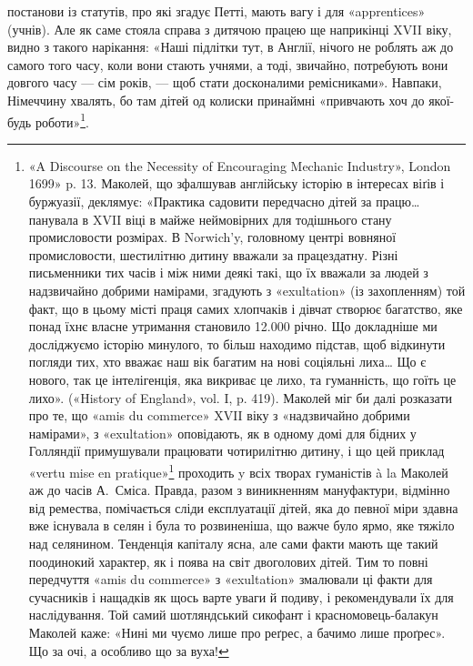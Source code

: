\parcont{}  %
постанови із статутів, про які згадує Петті, мають вагу і для
«apprentices» (учнів). Але як саме стояла справа з дитячою працею
ще наприкінці XVII віку, видно з такого нарікання: «Наші
підлітки тут, в Англії, нічого не роблять аж до самого того часу,
коли вони стають учнями, а тоді, звичайно, потребують вони довгого
часу — сім років, — щоб стати досконалими ремісниками».
Навпаки, Німеччину хвалять, бо там дітей од колиски принаймні
«привчають хоч до якої-будь роботи»\footnote{
«A Discourse on the Necessity of Encouraging Mechanic Industry»,
London 1699» p. 13. Маколей, що зфалшував англійську історію в інтересах
віґів і буржуазії, деклямує: «Практика садовити передчасно
дітей за працю\dots{} панувала в XVII віці в майже неймовірних для тодішнього
стану промисловости розмірах. В Norwich’y, головному центрі
вовняної промисловости, шестилітню дитину вважали за працездатну.
Різні письменники тих часів і між ними деякі такі, що їх вважали за людей
з надзвичайно добрими намірами, згадують з «exultation» (із захопленням)
той факт, що в цьому місті праця самих хлопчаків і дівчат створює
багатство, яке понад їхнє власне утримання становило \num{12.000} річно. Що докладніше ми досліджуємо історію минулого, то
більш находимо підстав, щоб відкинути погляди тих, хто вважає наш
вік багатим на нові соціяльні лиха\dots{} Що є нового, так це інтелігенція,
яка викриває це лихо, та гуманність, що гоїть це лихо». («History of
England», vol. I, p. 419). Маколей міг би далі розказати про те, що «amis
du commerce» XVII віку з «надзвичайно добрими намірами», з «exultation»
оповідають, як в одному домі для бідних у Голляндії примушували
працювати чотирилітню дитину, і що цей приклад «vertu mise en pratique»\footnote*{
— практичної чесноти. \emph{Ред.}
}
проходить y всіх творах гуманістів à la Маколей аж до часів
А.~Сміса. Правда, разом з виникненням мануфактури, відмінно від ремества,
помічається сліди експлуатації дітей, яка до певної міри здавна
вже існувала в селян і була то розвиненіша, що важче було ярмо,
яке тяжіло над селянином. Тенденція капіталу ясна, але сами факти
мають ще такий поодинокий характер, як і поява на світ двоголових
дітей. Тим то повні передчуття «amis du commerce» з «exultation» змалювали
ці факти для сучасників і нащадків як щось варте уваги й подиву,
і рекомендували їх для наслідування. Той самий шотляндський сикофант
і красномовець-балакун Маколей каже: «Нині ми чуємо лише про реґрес,
а бачимо лише проґрес». Що за очі, а особливо що за вуха!
}.

